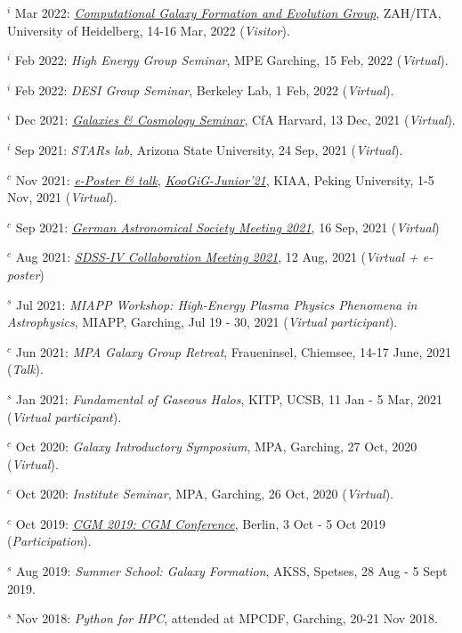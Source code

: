 \documentclass[12pt,letterpaper]{article}
\begin{document}
\begin{list}{}{\cvlist}
\item $^i$ Mar 2022:  \emph{\href{https://zah.uni-heidelberg.de/research-groups\#c2659}{Computational Galaxy Formation and Evolution Group}}, ZAH/ITA, University of Heidelberg, 14-16 Mar, 2022 (\textit{Visitor}).
\item $^i$ Feb 2022:  \emph{High Energy Group Seminar}, MPE Garching, 15 Feb, 2022 (\textit{Virtual}).
\item $^i$ Feb 2022:  \emph{DESI Group Seminar}, Berkeley Lab, 1 Feb, 2022 (\textit{Virtual}).
\item $^i$ Dec 2021:  \emph{\href{https://pweb.cfa.harvard.edu/calendar/event/9298}{Galaxies \& Cosmology Seminar}}, CfA Harvard, 13 Dec, 2021 (\textit{Virtual}).
\item $^i$ Sep 2021:  \textit{STARs lab}, Arizona State University, 24 Sep, 2021 (\textit{Virtual}).

\item $^c$ Nov 2021:  \emph{\href{https://www.bilibili.com/video/BV1nv411M7w3}{e-Poster \& talk}}, \emph{\href{https://kiaa.pku.edu.cn/KooGig_junior21/Home.htm}{KooGiG-Junior'21}}, KIAA, Peking University, 1-5 Nov, 2021 (\textit{Virtual}).

\item $^c$ Sep 2021:  \emph{\href{https://ag2021.astronomische-gesellschaft.de/view_splinter.php?session=Stars}{German Astronomical Society Meeting 2021}}, 16 Sep, 2021 (\textit{Virtual})
\item $^c$ Aug 2021:  \emph{\href{https://jhu2021.sdss.org/}{SDSS-IV Collaboration Meeting 2021}}, 12 Aug, 2021 (\textit{Virtual + e-poster})
\item $^s$ Jul 2021:  \emph{MIAPP Workshop: High-Energy Plasma Physics Phenomena in Astrophysics}, MIAPP, Garching, Jul 19 - 30, 2021 (\textit{Virtual participant}).

\item $^c$ Jun 2021:  \emph{MPA Galaxy Group Retreat}, Fraueninsel, Chiemsee, 14-17 June, 2021 (\textit{Talk}).
\item $^s$ Jan 2021:  \emph{Fundamental of Gaseous Halos}, KITP, UCSB, 11 Jan - 5 Mar, 2021 (\textit{Virtual participant}).
\item $^c$ Oct 2020:  \emph{Galaxy Introductory Symposium}, MPA, Garching, 27 Oct, 2020 (\textit{Virtual}).
\item $^c$ Oct 2020:  \emph{Institute Seminar}, MPA, Garching, 26 Oct, 2020 (\textit{Virtual}).

\item $^c$ Oct 2019:  \emph{\href{https://wwwmpa.mpa-garching.mpg.de/conf/berlincgm2019/}{CGM 2019: CGM Conference}}, Berlin, 3 Oct - 5 Oct 2019 (\textit{Participation}).
\item $^s$ Aug 2019:  \emph{Summer School: Galaxy Formation}, AKSS, Spetses, 28 Aug - 5 Sept 2019.
\item $^s$ Nov 2018:  \emph{Python for HPC}, attended at MPCDF, Garching, 20-21 Nov 2018.
\end{list}
\end{document}
